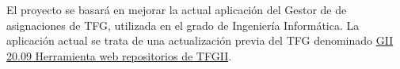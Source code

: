 
El proyecto se basará en mejorar la actual aplicación del Gestor de de asignaciones de TFG, utilizada en el grado de Ingeniería Informática. La aplicación actual se trata de una actualización previa del TFG denominado \href{https://github.com/dbo1001/Gestor-TFG-2021}{GII 20.09 Herramienta web
repositorios de TFGII}. 
